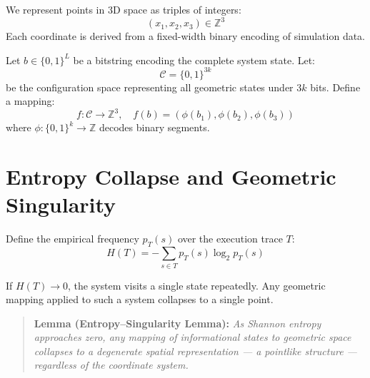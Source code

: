 \documentclass[11pt]{article}
\begin{document}
We represent points in 3D space as triples of integers:
\[
  (x_1, x_2, x_3) \in \mathbb{Z}^3
\]
Each coordinate is derived from a fixed-width binary encoding of simulation data.

Let $b \in \{0,1\}^L$ be a bitstring encoding the complete system state. Let:
\[
  \mathcal{C} = \{0,1\}^{3k}
\]
be the configuration space representing all geometric states under $3k$ bits. Define a mapping:
\[
  f : \mathcal{C} \to \mathbb{Z}^3, \quad f(b) = (\phi(b_1), \phi(b_2), \phi(b_3))
\]
where $\phi : \{0,1\}^k \to \mathbb{Z}$ decodes binary segments.

\section{Entropy Collapse and Geometric Singularity}

Define the empirical frequency $p_T(s)$ over the execution trace $T$:
\[
  H(T) = -\sum_{s \in T} p_T(s) \log_2 p_T(s)
\]

If $H(T) \to 0$, the system visits a single state repeatedly. Any geometric mapping applied to such a system collapses to a single point.

\begin{quote}
  \textbf{Lemma (Entropy--Singularity Lemma):}
  \emph{As Shannon entropy approaches zero, any mapping of informational states to geometric space collapses to a degenerate spatial representation — a pointlike structure — regardless of the coordinate system.}
\end{quote}
\end{document}
